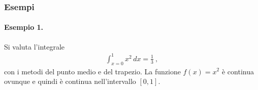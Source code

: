 \documentclass[letterpaper,10pt,english]{jupyterBook}
\begin{document}
\subsubsection{Esempi}
\label{\detokenize{ch/numerics/integrals:esempi}}

\paragraph{Esempio 1.}
\label{\detokenize{ch/numerics/integrals:esempio-1}}
\sphinxAtStartPar
Si valuta l’integrale
\begin{equation*}
\begin{split}\int_{x = 0}^{1} x^2 \, dx = \frac{1}{3} \ ,\end{split}
\end{equation*}
\sphinxAtStartPar
con i metodi del punto medio e del trapezio. La funzione \(f(x) = x^2\) è continua ovunque e quindi è continua nell’intervallo \([0,1]\).
\end{document}
